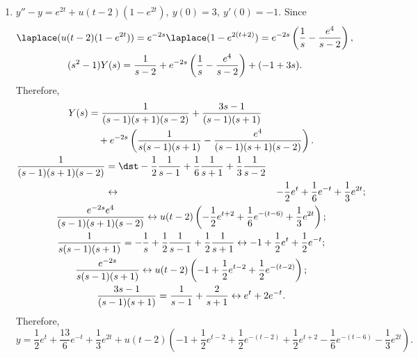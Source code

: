 \documentclass[openany]{book}
\newenvironment{sectionSolutions}{
 \begin{enumerate}[item-label={\thesection.\arabic{enumi}.}]
}{
 \end{enumerate}
}
\begin{document}
\begin{sectionSolutions}
\item
 $y''-y=e^{2t}+u(t-2)(1-e^{2t}),\ y(0)=3,\ y'(0)=-1$.
Since
\begin{gather*}
\laplace (u(t-2)(1-e^{2t}))=e^{-2s}\laplace (1-e^{2(t+2)})=e^{-2s}
\left(\frac{1}{ s}-\frac{e^4}{ s-2}\right),
\\
(s^2-1)Y(s)=\frac{1}{ s-2}+e^{-2s}\left(\frac{1}{ s}-\frac{e^4}{ s-2}\right)
+(-1+3s).
\end{gather*}
Therefore,
\begin{gather*}
\begin{aligned}
Y(s)&=\frac{1}{(s-1)(s+1)(s-2)}+\frac{3s-1}{(s-1)(s+1)}\\
&\quad+e^{-2s}\left(\frac{1}{s(s-1)(s+1)}-\frac{e^4}{(s-1)(s+1)(s-2)}\right).
\end{aligned}\\
\begin{aligned}
\frac{1}{(s-1)(s+1)(s-2)}&=\dst-\frac{1}{2}\frac{1}{s-1}+\frac{1}{6}\frac{1}{ s+1}
+\frac{1}{3}\frac{1}{ s-2}\\
&\leftrightarrow&-\frac{1}{2}e^t+\frac{1}{6}e^{-t}+\frac{1}{3}e^{2t};
\end{aligned}
\\
\frac{e^{-2s}e^4}{(s-1)(s+1)(s-2)}
\leftrightarrow u(t-2)\left(
-\frac{1}{2}e^{t+2}+\frac{1}{6}e^{-(t-6)}+\frac{1}{3}e^{2t}\right);
\\
\frac{1}{ s(s-1)(s+1)}=-\frac{1}{ s}+\frac{1}{2}\frac{1}{ s-1}
+\frac{1}{2}\frac{1}{ s+1}
\leftrightarrow -1+\frac{1}{2}e^t+\frac{1}{2}e^{-t};
\\
\frac{e^{-2s}}{ s(s-1)(s+1)}
\leftrightarrow
u(t-2)\left(-1+\frac{1}{2}e^{t-2}+\frac{1}{2}e^{-(t-2)}\right);
\\
\frac{3s-1}{(s-1)(s+1)}=\frac{1}{ s-1}+\frac{2}{ s+1}\leftrightarrow
e^t+2e^{-t}.
\end{gather*}
Therefore,
\[
y=\frac{1}{2}e^t+\frac{13}{6}e^{-t}+ \frac{1}{ 3}e^{2t}
+u(t-2)\left(-1+\frac{1}{ 2}e^{t-2}+\frac{1}{2}e^{-(t-2)}+
\frac{1}{2}e^{t+2}-\frac{1}{6} e^{-(t-6)}-\frac{1}{3}e^{2t}\right).
\]




\end{sectionSolutions}
\end{document}
